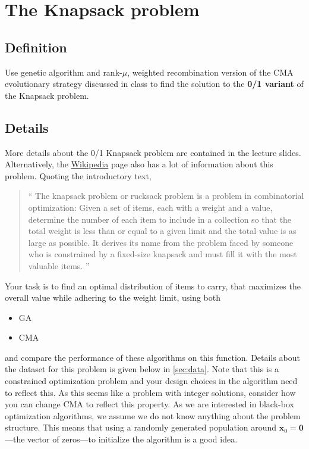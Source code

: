 \documentclass[11pt]{article}
\begin{document}
\section{The Knapsack problem}
\label{sec:orgb1b16ac}
\subsection{Definition}
\label{sec:org7cbefcb}
  Use genetic algorithm and rank-\(\mu\), weighted recombination version of the CMA
evolutionary strategy discussed in class to find the solution to the \textbf{0/1 variant} of
the Knapsack problem.
\subsection{Details}
\label{sec:org1689650}
More details about the 0/1 Knapsack problem are contained in the lecture slides.
Alternatively, the \href{https://en.wikipedia.org/wiki/Knapsack\_problem}{Wikipedia} page also has a lot of information about this
problem. Quoting the introductory text,
\begin{quote}
`` The knapsack problem or rucksack problem is a problem in combinatorial
optimization: Given a set of items, each with a weight and a value, determine
the number of each item to include in a collection so that the total weight is
less than or equal to a given limit and the total value is as large as possible.
It derives its name from the problem faced by someone who is constrained by a
fixed-size knapsack and must fill it with the most valuable items. ''
\end{quote}

Your task is to find an optimal distribution of items to carry, that
maximizes the overall value while adhering to the weight limit, using both
\begin{itemize}
\item GA
\item CMA
\end{itemize}
and compare the performance of these algorithms on this function. Details about
the dataset for this problem is given below in \cref{sec:data}. Note that this is a constrained
optimization problem and your design choices in the
algorithm need to reflect this. As this seems like a problem with integer
solutions, consider how you can change CMA to reflect this property. As we are
interested in black-box optimization algorithms, we assume we do not know
anything about the problem structure. This means that using a randomly generated
population around \(\mathbf{x}_0 =\mathbf{0}\)---the vector of zeros---to
initialize the algorithm is a good idea.
\end{document}
